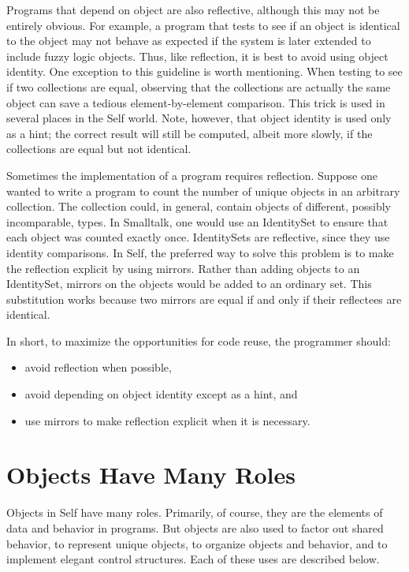 \documentclass[letterpaper,10pt,english]{sphinxmanual}
\begin{document}
Programs that depend on object  are also reflective, although this may not be entirely obvious.
For example, a program that tests to see if an object is identical to the object  may not
behave as expected if the system is later extended to include fuzzy logic objects. Thus, like reflection,
it is best to avoid using object identity. One exception to this guideline is worth mentioning.
When testing to see if two collections are equal, observing that the collections are actually the
same object can save a tedious element-by-element comparison. This trick is used in several places
in the Self world. Note, however, that object identity is used only as a hint; the correct result will
still be computed, albeit more slowly, if the collections are equal but not identical.

Sometimes the implementation of a program requires reflection. Suppose one wanted to write a
program to count the number of unique objects in an arbitrary collection. The collection could, in
general, contain objects of different, possibly incomparable, types. In Smalltalk, one would use an
IdentitySet to ensure that each object was counted exactly once. IdentitySets are reflective, since
they use identity comparisons. In Self, the preferred way to solve this problem is to make the reflection
explicit by using mirrors. Rather than adding objects to an IdentitySet, mirrors on the objects
would be added to an ordinary set. This substitution works because two mirrors are equal if
and only if their reflectees are identical.

In short, to maximize the opportunities for code reuse, the programmer should:
\begin{itemize}
\item {} 
avoid reflection when possible,

\item {} 
avoid depending on object identity except as a hint, and

\item {} 
use mirrors to make reflection explicit when it is necessary.

\end{itemize}


\section{Objects Have Many Roles}
\label{\detokenize{progguid:objects-have-many-roles}}
Objects in Self have many roles. Primarily, of course, they are the elements of data and behavior
in programs. But objects are also used to factor out shared behavior, to represent unique objects, to
organize objects and behavior, and to implement elegant control structures. Each of these uses are
described below.
\end{document}
